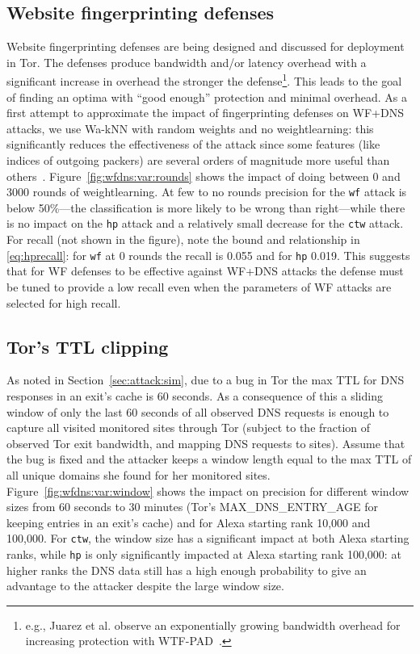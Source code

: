 \subsection{Website fingerprinting defenses}
Website fingerprinting defenses are being
designed and discussed for deployment in Tor.
The defenses produce bandwidth and/or latency overhead with a significant
increase in overhead the stronger the defense\footnote{e.g., Juarez et al.
observe an exponentially growing bandwidth overhead for increasing protection
with WTF-PAD~\cite{DBLP:journals/corr/JuarezIPDW15}.}.
This leads to the goal of finding an optima with ``good enough''
protection and minimal overhead.
As a first attempt to approximate the impact of fingerprinting
defenses on WF+DNS attacks, we use Wa-kNN with
random weights and no weightlearning: this significantly reduces the
effectiveness of the attack since some features (like indices of outgoing
packers) are several orders of magnitude more useful
than others~\cite{DBLP:journals/corr/JuarezIPDW15}.
Figure~\ref{fig:wfdns:var:rounds} shows the impact of doing between 0 and 3000
rounds of weightlearning. At few to no rounds precision for the \texttt{wf}
attack is below 50\%---the classification is more likely to be wrong than
right---while there is no impact on the \texttt{hp} attack and a relatively
small decrease for the \texttt{ctw} attack.
For recall (not shown in the figure), note the bound and relationship in
\ref{eq:hprecall}: for \texttt{wf} at 0 rounds the recall is 0.055 and for
\texttt{hp} 0.019. This suggests that for WF defenses to
be effective against WF+DNS attacks the defense must be tuned to provide a
low recall even when the parameters of WF attacks are selected for high
recall.

\subsection{Tor's TTL clipping}
As noted in Section~\ref{sec:attack:sim}, due to a bug in Tor the max TTL
for DNS responses in an exit's cache is 60 seconds. As a consequence of this
a sliding window of only the last 60 seconds of all observed DNS requests is
enough to capture all visited monitored sites through Tor (subject to the
fraction of observed Tor exit bandwidth, and mapping DNS requests to sites).
Assume that the bug is fixed and the attacker keeps a window length equal
to the max TTL of all unique domains she found for her monitored sites.
Figure~\ref{fig:wfdns:var:window} shows the impact on precision for different
window sizes from 60 seconds to 30 minutes (Tor's MAX\_DNS\_ENTRY\_AGE
for keeping entries in an exit's cache) and for Alexa starting rank 10,000 and
100,000. For \texttt{ctw}, the window size has a significant impact at both
Alexa starting ranks, while \texttt{hp} is only significantly impacted at
Alexa starting rank 100,000: at higher ranks the DNS data still has a high
enough probability to give an advantage to the attacker despite the large
window size.

